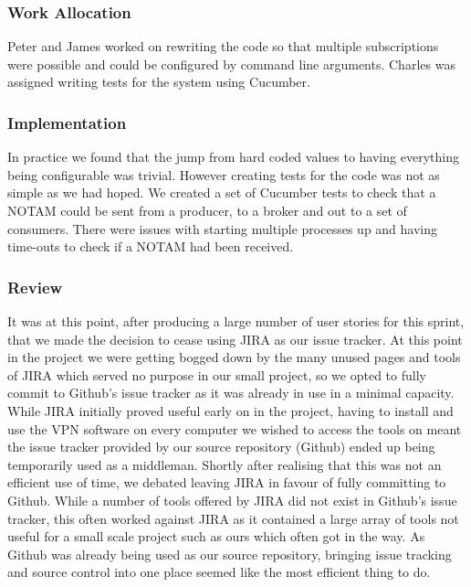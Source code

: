\documentclass[a4paper, 12pt]{article}
\begin{document}
\subsubsection{Work Allocation}

Peter and James worked on rewriting the code so that multiple subscriptions were possible and could be configured by command line arguments. Charles was assigned writing tests for the system using Cucumber.

\subsubsection{Implementation}

In practice we found that the jump from hard coded values to having everything being configurable was trivial. However creating tests for the code was not as simple as we had hoped. We created a set of Cucumber tests to check that a NOTAM could be sent from a producer, to a broker and out to a set of consumers. There were issues with starting multiple processes up and having time-outs to check if a NOTAM had been received.

\subsubsection{Review}

It was at this point, after producing a large number of user stories for this sprint, that we made the decision to cease using JIRA as our issue tracker. At this point in the project we were getting bogged down by the many unused pages and tools of JIRA which served no purpose in our small project, so we opted to fully commit to Github's issue tracker as it was already in use in a minimal capacity. While JIRA initially proved useful early on in the project, having to install and use the VPN software on every computer we wished to access the tools on meant the issue tracker provided by our source repository (Github) ended up being temporarily used as a middleman. Shortly after realising that this was not an efficient use of time, we debated leaving JIRA in favour of fully committing to Github. While a number of tools offered by JIRA did not exist in Github's issue tracker, this often worked against JIRA as it contained a large array of tools not useful for a small scale project such as ours which often got in the way. As Github was already being used as our source repository, bringing issue tracking and source control into one place seemed like the most efficient thing to do.
\end{document}
